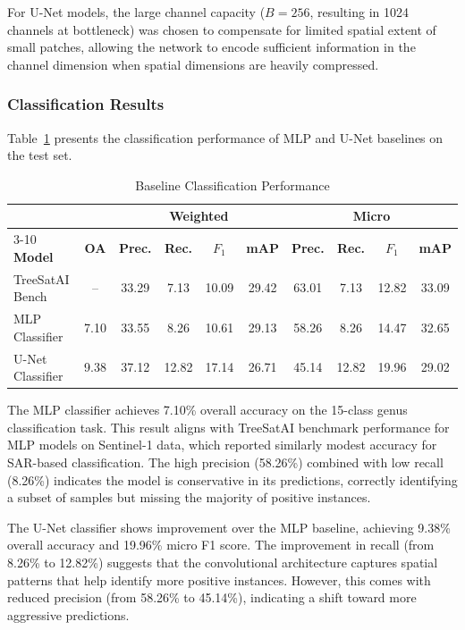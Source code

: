 For U-Net models, the large channel capacity ($B = 256$, resulting in 1024 channels at bottleneck) was chosen to compensate for limited spatial extent of small patches, allowing the network to encode sufficient information in the channel dimension when spatial dimensions are heavily compressed.

\subsubsection{Classification Results}

Table~\ref{tab:baseline_classification} presents the classification performance of MLP and U-Net baselines on the test set.

\begin{table}[htbp]
\centering
\caption{Baseline Classification Performance}
\label{tab:baseline_classification}
\footnotesize
\begin{tabular}{l|c|cccc|cccc}
\hline
 & & \multicolumn{4}{c|}{\textbf{Weighted}} & \multicolumn{4}{c}{\textbf{Micro}} \\
\cline{3-10}
\textbf{Model} & \textbf{OA} & \textbf{Prec.} & \textbf{Rec.} & \textbf{$F_1$} & \textbf{mAP} & \textbf{Prec.} & \textbf{Rec.} & \textbf{$F_1$} & \textbf{mAP} \\
\hline
TreeSatAI Bench & -- & 33.29 & 7.13 & 10.09 & 29.42 & 63.01 & 7.13 & 12.82 & 33.09 \\
MLP Classifier & 7.10 & 33.55 & 8.26 & 10.61 & 29.13 & 58.26 & 8.26 & 14.47 & 32.65 \\
U-Net Classifier & 9.38 & 37.12 & 12.82 & 17.14 & 26.71 & 45.14 & 12.82 & 19.96 & 29.02 \\
\hline
\end{tabular}
\end{table}

The MLP classifier achieves 7.10\% overall accuracy on the 15-class genus classification task. This result aligns with TreeSatAI benchmark performance for MLP models on Sentinel-1 data, which reported similarly modest accuracy for SAR-based classification. The high precision (58.26\%) combined with low recall (8.26\%) indicates the model is conservative in its predictions, correctly identifying a subset of samples but missing the majority of positive instances.

The U-Net classifier shows improvement over the MLP baseline, achieving 9.38\% overall accuracy and 19.96\% micro F1 score. The improvement in recall (from 8.26\% to 12.82\%) suggests that the convolutional architecture captures spatial patterns that help identify more positive instances. However, this comes with reduced precision (from 58.26\% to 45.14\%), indicating a shift toward more aggressive predictions.

